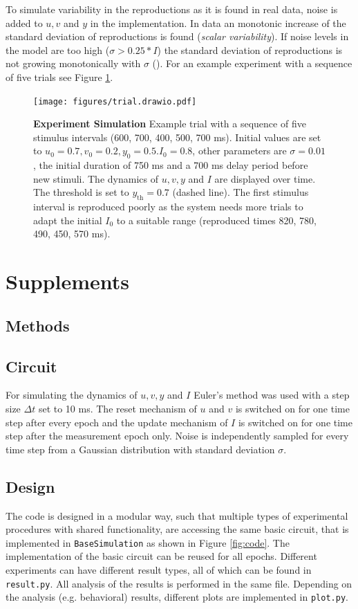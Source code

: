 \documentclass[10pt]{article}
\begin{document}
To simulate variability in the reproductions as it is found in real data, noise is added to $u, v$ and $y$ in the implementation. In data an monotonic increase of the standard deviation of reproductions is found (\textit{scalar variability}). 
If noise levels in the model are too high ($\sigma>0.25*I$) the standard deviation of reproductions is not growing monotonically with $\sigma$ (\cite{Egger2020}). 
For an example experiment with a sequence of five trials see Figure \ref{fig:experiment}. 

\begin{figure}[ht]
	\centering
	\texttt{[image: figures/trial.drawio.pdf]}
	\caption{\textbf{Experiment Simulation} Example trial with a sequence of five stimulus intervals (600, 700, 400, 500, 700 ms). Initial values are set to $u_0=0.7 , v_0=0.2 , y_0=0.5. I_0=0.8$, other parameters are $\sigma=0.01$, the initial duration of 750 ms and a 700 ms delay period before new stimuli. The dynamics of $u, v, y $ and $I$ are displayed over time. The threshold is set to $y_{\text{th}}=0.7$ (dashed line). The first stimulus interval is reproduced poorly as the system needs more trials to adapt the initial $I_0$ to a suitable range (reproduced times 820, 780, 490, 450, 570 ms).}
\label{fig:experiment}
\end{figure}


\section{Supplements}
\subsection{Methods}
\subsection*{Circuit}
For simulating the dynamics of $u, v, y$ and $I$ Euler's method was used with a step size $\Delta t$ set to 10 ms.
The reset mechanism of $u$ and $v$ is switched on for one time step after every epoch and the update mechanism of $I$ is switched on for one time step after the measurement epoch only.
Noise is independently sampled for every time step from a Gaussian distribution with standard deviation $\sigma$.

\subsection{Design}
The code is designed in a modular way, such that multiple types of experimental procedures with shared functionality, are accessing the same basic circuit, that is implemented in \texttt{BaseSimulation} as shown in Figure \ref{fig:code}.
The implementation of the basic circuit can be reused for all epochs.
Different experiments can have different result types, all of which can be found in \texttt{result.py}. All analysis of the results is performed in the same file. Depending on the analysis (e.g. behavioral) results, different plots are implemented in \texttt{plot.py}. 
\end{document}
